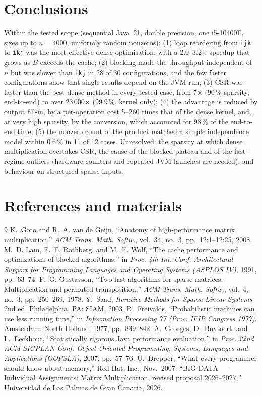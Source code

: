 \documentclass[11pt,a4paper]{article}
\begin{document}
\section{Conclusions}
Within the tested scope (sequential Java~21, double precision, one i5-10400F, sizes up to $n=4000$, uniformly random nonzeros): (1) loop reordering from \texttt{ijk} to \texttt{ikj} was the most effective dense optimisation, with a 2.0--3.2$\times$ speedup that grows as $B$ exceeds the cache; (2) blocking made the throughput independent of $n$ but was slower than \texttt{ikj} in 28 of 30 configurations, and the few faster configurations show that single results depend on the JVM run; (3) CSR was faster than the best dense method in every tested case, from 7$\times$ (90\,\% sparsity, end-to-end) to over 23\,000$\times$ (99.9\,\%, kernel only); (4) the advantage is reduced by output fill-in, by a per-operation cost 5--260 times that of the dense kernel, and, at very high sparsity, by the conversion, which accounted for 98\,\% of the end-to-end time; (5) the nonzero count of the product matched a simple independence model within 0.6\,\% in 11 of 12 cases. Unresolved: the sparsity at which dense multiplication overtakes CSR, the cause of the blocked plateau and of the fast-regime outliers (hardware counters and repeated JVM launches are needed), and behaviour on structured sparse inputs.

\section*{References and materials}
\renewcommand{\refname}{\vspace{-1.2em}}
\begin{thebibliography}{9}\small
{} K.~Goto and R.~A. van de Geijn, ``Anatomy of high-performance matrix multiplication,'' \emph{ACM Trans. Math. Softw.}, vol.~34, no.~3, pp.~12:1--12:25, 2008.
 M.~D. Lam, E.~E. Rothberg, and M.~E. Wolf, ``The cache performance and optimizations of blocked algorithms,'' in \emph{Proc. 4th Int. Conf. Architectural Support for Programming Languages and Operating Systems (ASPLOS IV)}, 1991, pp.~63--74.
 F.~G. Gustavson, ``Two fast algorithms for sparse matrices: Multiplication and permuted transposition,'' \emph{ACM Trans. Math. Softw.}, vol.~4, no.~3, pp.~250--269, 1978.
 Y.~Saad, \emph{Iterative Methods for Sparse Linear Systems}, 2nd ed. Philadelphia, PA: SIAM, 2003.
 R.~Freivalds, ``Probabilistic machines can use less running time,'' in \emph{Information Processing 77 (Proc. IFIP Congress 1977)}. Amsterdam: North-Holland, 1977, pp.~839--842.
 A.~Georges, D.~Buytaert, and L.~Eeckhout, ``Statistically rigorous Java performance evaluation,'' in \emph{Proc. 22nd ACM SIGPLAN Conf. Object-Oriented Programming, Systems, Languages and Applications (OOPSLA)}, 2007, pp.~57--76.
 U.~Drepper, ``What every programmer should know about memory,'' Red Hat, Inc., Nov.\ 2007.
 ``BIG DATA --- Individual Assignments: Matrix Multiplication, revised proposal 2026--2027,'' Universidad de Las Palmas de Gran Canaria, 2026.
\end{thebibliography}
\end{document}
